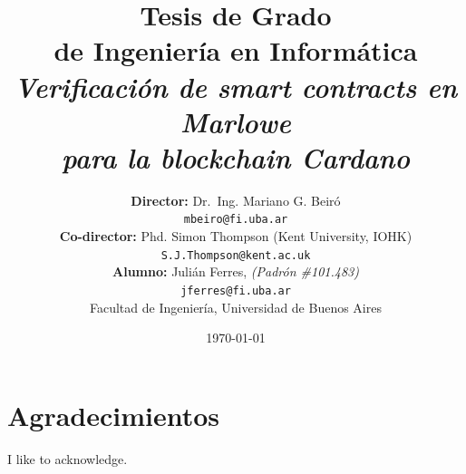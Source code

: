 \documentclass[12pt]{book}
\begin{document}


\begin{titlepage}

	\title{     \textbf{Tesis de Grado \\ de Ingeniería en Informática}\\[2.5ex]
		\textit{Verificación de smart contracts en Marlowe\\ para la blockchain Cardano}}

	\author{
		\textbf{Director:} Dr.\ Ing. Mariano G. Beiró \\
		\texttt{mbeiro@fi.uba.ar}\\[2.5ex]
		\textbf{Co-director:} Phd. Simon Thompson (Kent University, IOHK) \\
		\texttt{S.J.Thompson@kent.ac.uk}
		\\[2.5ex]
		\textbf{Alumno:} Julián Ferres, \textit{(Padrón \#101.483)}                                \\
		\texttt{ jferres@fi.uba.ar }                                    \\[2.5ex]
		\normalsize{Facultad de Ingeniería, Universidad de Buenos Aires}        \\
	}
	\date{\today}

\end{titlepage}

\maketitle
\thispagestyle{empty}

\maketitle


\chapter*{Agradecimientos}
\thispagestyle{empty} %

I like to acknowledge.

\clearpage 


{
	\hypersetup{linkcolor=black}
	\tableofcontents
    \listoffigures
    \lstlistoflistings
}

\end{document}
